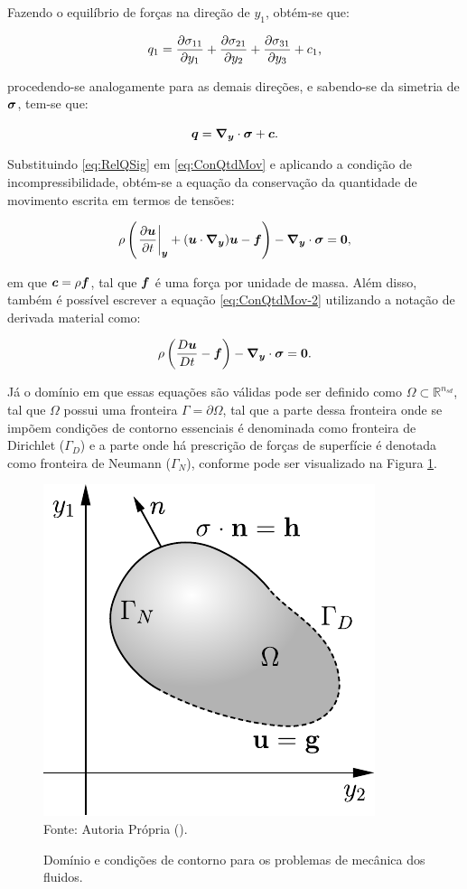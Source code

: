 Fazendo o equilíbrio de forças na direção de $y_1$, obtém-se que:

\begin{equation}
    q_1=\frac{\partial{\sigma_{11}}}{\partial{y_1}}+\frac{\partial{\sigma_{21}}}{\partial{y_2}}+\frac{\partial{\sigma_{31}}}{\partial{y_3}}+c_1\text{,}
\end{equation}

\noindent procedendo-se analogamente para as demais direções, e sabendo-se da simetria de $\boldsymbol{\sigma}$, tem-se que:

\begin{equation}
    \boldsymbol{q}=\boldsymbol{\nabla_y}\cdot\boldsymbol{\sigma}+\boldsymbol{c}\text{.}
    \label{eq:RelQSig}
\end{equation}

Substituindo \eqref{eq:RelQSig} em \eqref{eq:ConQtdMov} e aplicando a condição de incompressibilidade, obtém-se a equação da conservação da quantidade de movimento escrita em termos de tensões:

\begin{equation}
    \rho\left({\left.\frac{\partial \boldsymbol{u}}{\partial t}\right|_{\boldsymbol{y}}+(\boldsymbol{u}\cdot\boldsymbol{\nabla_y})\boldsymbol{u}-\boldsymbol{f}}\right)-\boldsymbol{\nabla_y}\cdot\boldsymbol{\sigma}=\boldsymbol{0}\text{,}
    \label{eq:ConQtdMov-2}
\end{equation}

\noindent em que $\boldsymbol{c}=\rho\boldsymbol{f}$, tal que $\boldsymbol{f}$ é uma força por unidade de massa. Além disso, também é possível escrever a equação \eqref{eq:ConQtdMov-2} utilizando a notação de derivada material como:

\begin{equation}
    \rho\left({\frac{D\boldsymbol{u}}{Dt}-\boldsymbol{f}}\right)-\boldsymbol{\nabla_y}\cdot\boldsymbol{\sigma}=\boldsymbol{0}\text{.}
    \label{eq:ConQtdMov-3}
\end{equation}

Já o domínio em que essas equações são válidas pode ser definido como $\Omega\subset\mathbb{R}^{n_{sd}}$, tal que $\Omega$ possui uma fronteira $\Gamma=\partial\Omega$, tal que a parte dessa fronteira onde se impõem condições de contorno essenciais é denominada como fronteira de Dirichlet ($\Gamma_D$) e a parte onde há prescrição de forças de superfície é denotada como fronteira de Neumann ($\Gamma_N$), conforme pode ser visualizado na Figura \ref{fig:Dom}.

\begin{figure}[h!]
    \centering
    \caption{Domínio e condições de contorno para os problemas de mecânica dos fluidos.}
    \includegraphics[width=.35\linewidth]{Figuras/Dom}
    \\Fonte: Autoria Própria (\the\year).
    \label{fig:Dom}
\end{figure}

